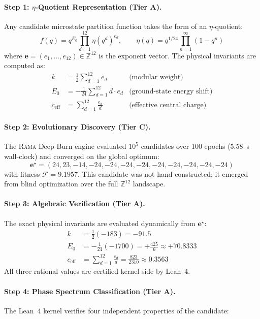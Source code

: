 \documentclass[11pt,a4paper]{article}
\theoremstyle{plain}
\theoremstyle{definition}
\theoremstyle{remark}
\newcommand{\tierA}{\textbf{Tier A}}
\newcommand{\tierC}{\textbf{Tier C}}
\begin{document}
\paragraph{Step 1: $\eta$-Quotient Representation (\tierA{}).}
Any candidate microstate partition function takes the form of an
$\eta$-quotient:
\[
  f(q) = q^{E_0} \prod_{d=1}^{12} \eta(q^d)^{e_d}, \qquad
  \eta(q) = q^{1/24} \prod_{n=1}^{\infty}(1 - q^n)
\]
where $\mathbf{e} = (e_1, \ldots, e_{12}) \in \mathbb{Z}^{12}$ is the
exponent vector. The physical invariants are computed as:
\begin{align}
  k &= \tfrac{1}{2} \textstyle\sum_{d=1}^{12} e_d
  & \text{(modular weight)} \label{eq:weight} \\
  E_0 &= -\tfrac{1}{24} \textstyle\sum_{d=1}^{12} d \cdot e_d
  & \text{(ground-state energy shift)} \label{eq:E0} \\
  c_{\mathrm{eff}} &= \textstyle\sum_{d=1}^{12} \frac{e_d}{d}
  & \text{(effective central charge)} \label{eq:ceff}
\end{align}

\paragraph{Step 2: Evolutionary Discovery (\tierC{}).}
The \textsc{Rama} Deep Burn engine evaluated $10^5$ candidates over 100
epochs (5.58~s wall-clock) and converged on the global optimum:
\[
  \mathbf{e}^{\star} = (24, 23, -14, -24, -24, -24, -24, -24, -24, -24, -24, -24)
\]
with fitness $\mathcal{F} = 9.1957$. This candidate was not
hand-constructed; it emerged from blind optimization over the full
$\mathbb{Z}^{12}$ landscape.

\paragraph{Step 3: Algebraic Verification (\tierA{}).}
The exact physical invariants are evaluated dynamically from $\mathbf{e}^\star$:
\begin{align*}
  k &= \tfrac{1}{2} (-183) = -91.5 \\
  E_0 &= -\tfrac{1}{24} (-1700) = +\tfrac{425}{6} \approx +70.8333 \\
  c_{\mathrm{eff}} &= \textstyle\sum_{d=1}^{12} \frac{e_d}{d} = \tfrac{823}{2310} \approx 0.3563
\end{align*}
\noindent All three rational values are certified kernel-side by Lean~4.

\paragraph{Step 4: Phase Spectrum Classification (\tierA{}).}
The Lean~4 kernel verifies four independent properties of the candidate:
\end{document}
